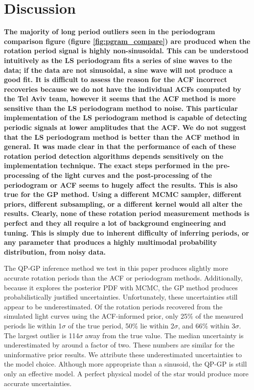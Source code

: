 \documentclass[a4paper,fleqn,usenatbib,useAMS]{mnras}
\newcommand{\tdmcomment}[1]{{\color{blue}#1}}
\begin{document}
\section{Discussion}
\label{sec:discussion}

{\bf The majority of long period outliers seen in the periodogram comparison
figure (figure \ref{fig:pgram_compare}) are produced when the rotation period
signal is highly non-sinusoidal.
This can be understood intuitively as the LS periodogram fits a series of sine
waves to the data; if the data are not sinusoidal, a sine wave will not
produce a good fit.
It is difficult to assess the reason for the ACF incorrect recoveries because
we do not have the individual ACFs computed by the \citet{Aigrain2015} Tel
Aviv team, however it seems that the ACF method is more sensitive than the LS
periodogram method to noise.
This particular implementation of the LS periodogram method is capable of
detecting periodic signals at lower amplitudes that the ACF.
We do not suggest that the LS periodogram method is better than the ACF method
in general.
It was made clear in \citet{Aigrain2015} that the performance of each of these
rotation period detection algorithms depends sensitively on the
implementation technique.
The exact steps performed in the pre-processing of the light curves and the
post-processing of the periodogram or ACF seems to hugely affect the results.
This is also true for the GP method.
Using a different MCMC sampler, different priors, different subsampling, or a
different kernel would all alter the results.
Clearly, none of these rotation period measurement methods is perfect and they
all require a lot of background engineering and tuning.
This is simply due to inherent difficulty of inferring periods, or any
parameter that produces a highly multimodal probability distribution, from
noisy data.}

The QP-GP inference method we test in this paper produces slightly more
accurate rotation periods than the ACF or periodogram methods.
Additionally, because it explores the posterior PDF with MCMC, the GP method
produces probabilistically justified uncertainties.
Unfortunately, these uncertainties still appear to be underestimated.
Of the rotation periods recovered from the simulated light curves using the
ACF-informed prior, only 25\% of the measured periods lie within 1$\sigma$ of
the true period, 50\% lie within 2$\sigma$, and 66\% within 3$\sigma$.
The largest outlier is 114$\sigma$ away from the true value.
The median uncertainty is underestimated by around a factor of two.
These numbers are similar for the uninformative prior results.
We attribute these underestimated uncertainties to the model choice.
Although more appropriate than a sinusoid, the QP-GP is still only an
 effective model.
A perfect physical model of the star would produce more accurate
uncertainties.
\end{document}
